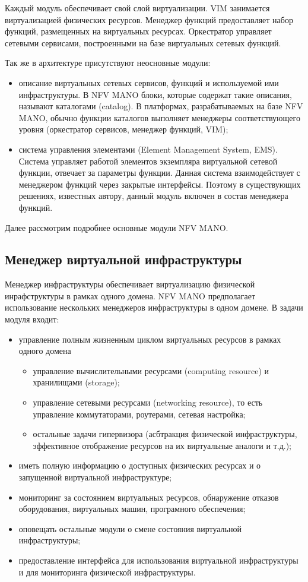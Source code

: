 \documentclass[oneside,final,14pt,a4paper]{extreport}
\begin{document}
Каждый модуль обеспечивает свой слой виртуализации. VIM занимается виртуализацией физических ресурсов. Менеджер функций предоставляет набор функций, размещенных на виртуальных ресурсах. Оркестратор управляет сетевыми сервисами, построенными на базе виртуальных сетевых функций.

Так же в архитектуре присутствуют неосновные модули:
\begin{itemize}
	\item описание виртуальных сетевых сервисов, функций и используемой ими инфраструктуры. В NFV MANO блоки, которые содержат такие описания, называют каталогами (catalog). В платформах, разрабатываемых на базе NFV MANO, обычно функции каталогов выполняет менеджеры соответствующего уровня (оркестратор сервисов, менеджер функций, VIM);
	\item система управления элементами (Element Management System, EMS). Система управляет работой элементов экземпляра виртуальной сетевой функции, отвечает за параметры функции. Данная система взаимодействует с менеджером функций через закрытые интерфейсы. Поэтому в существующих решениях, известных автору, данный модуль включен в состав менеджера функций.
\end{itemize}

Далее рассмотрим подробнее основные модули NFV MANO.

\subsection{Менеджер виртуальной инфраструктуры}
Менеджер инфраструктуры обеспечивает виртуализацию физической инрафструктуры в рамках одного домена. NFV MANO предполагает использование нескольких менеджеров инфраструктуры в одном домене. В задачи модуля входит:

\begin{itemize}
	\item управление полным жизненным циклом виртуальных ресурсов в рамках одного домена
	\begin{itemize}
		\item управление вычислительными ресурсами (computing resource) и хранилищами (storage);
		\item управление сетевыми ресурсами (networking resource), то есть управление коммутаторами, роутерами, сетевая настройка;
		\item остальные задачи гипервизора (асбтракция физической инфраструктуры, эффективное отображение ресурсов на их виртуальные аналоги и т.д.);
	\end{itemize}
	\item иметь полную информацию о доступных физических ресурсах и о запущенной виртуальной инфраструктуре;
	\item мониторинг за состоянием виртуальных ресурсов, обнаружение отказов оборудования, виртуальных машин, програмного обеспечения;
	\item оповещать остальные модули о смене состояния виртуальной инфраструктуры;
	\item предоставление интерфейса для использования виртуальной инфраструктуры и для мониторинга физической инфраструктуры.
\end{itemize}
\end{document}
